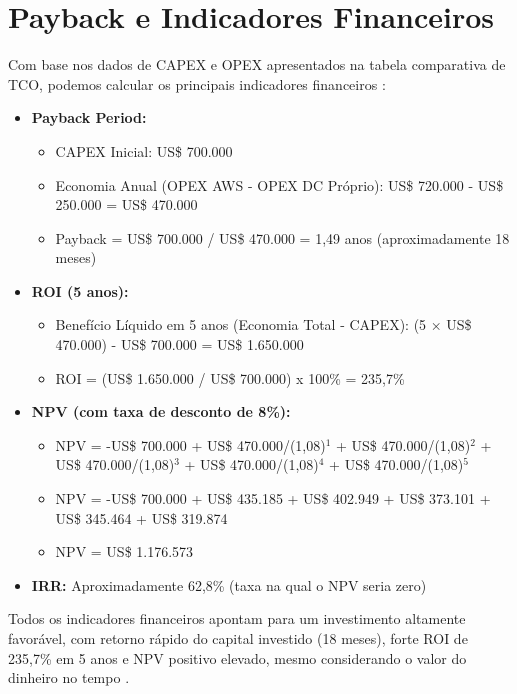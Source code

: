 \documentclass[
	12pt,				%
	oneside,			%
	a4paper,			%
	english,			%
	brazil				%
	]{abntex2unama}
\begin{document}
\section{Payback e Indicadores Financeiros}
Com base nos dados de CAPEX e OPEX apresentados na tabela comparativa de TCO, podemos calcular os principais indicadores financeiros \cite{reliability_engineering}:

\begin{itemize}
	\item \textbf{Payback Period:}
	      \begin{itemize}
		      \item CAPEX Inicial: US\$ 700.000
		      \item Economia Anual (OPEX AWS - OPEX DC Próprio): US\$ 720.000 - US\$ 250.000 = US\$ 470.000
		      \item Payback = US\$ 700.000 / US\$ 470.000 = 1,49 anos (aproximadamente 18 meses) \cite{dcim_systems}
	      \end{itemize}
	\item \textbf{ROI (5 anos):}
	      \begin{itemize}
		      \item Benefício Líquido em 5 anos (Economia Total - CAPEX): (5 × US\$ 470.000) - US\$ 700.000 = US\$ 1.650.000
		      \item ROI = (US\$ 1.650.000 / US\$ 700.000) x 100\% = 235,7\% \cite{capacity_planning}
	      \end{itemize}
	\item \textbf{NPV (com taxa de desconto de 8\%):}
	      \begin{itemize}
		      \item NPV = -US\$ 700.000 + US\$ 470.000/(1,08)$^1$ + US\$ 470.000/(1,08)$^2$ + US\$ 470.000/(1,08)$^3$ + US\$ 470.000/(1,08)$^4$ + US\$ 470.000/(1,08)$^5$
		      \item NPV = -US\$ 700.000 + US\$ 435.185 + US\$ 402.949 + US\$ 373.101 + US\$ 345.464 + US\$ 319.874
		      \item NPV = US\$ 1.176.573 \cite{datacenter_automation}
	      \end{itemize}
	\item \textbf{IRR:} Aproximadamente 62,8\% (taxa na qual o NPV seria zero) \cite{green_datacenters}
\end{itemize}

Todos os indicadores financeiros apontam para um investimento altamente favorável, com retorno rápido do capital investido (18 meses), forte ROI de 235,7\% em 5 anos e NPV positivo elevado, mesmo considerando o valor do dinheiro no tempo \cite{hyperscale_datacenters} \cite{design_principles}.
\end{document}
